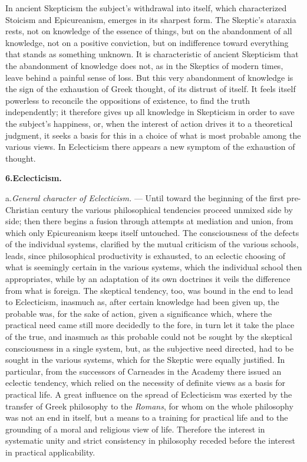 In ancient Skepticism the subject's withdrawal into itself,
which characterized Stoicism and Epicureanism, emerges in
its sharpest form. The Skeptic's ataraxia rests, not on
knowledge of the essence of things, but on the abandonment of all
knowledge, not on a positive conviction, but on indifference toward everything that stands as something unknown. It is characteristic
of ancient Skepticism that the abandonment of knowledge does not,
as in the Skeptics of modern times, leave behind a painful
sense of loss. But this very abandonment of knowledge is the sign of
the exhaustion of Greek thought, of its distrust of itself.
It feels itself powerless to reconcile the oppositions of existence, to find the truth independently; it therefore gives up
all knowledge in Skepticism in order to save the subject's happiness, or,
when the interest of action drives it to a theoretical judgment, it seeks
a basis for this in a choice of what is most probable among the various views. In Eclecticism there appears
a new symptom of the exhaustion of thought.

\divrule

\begin{center}
\textbf{6.\enspace Eclecticism.}
\end{center}

a.\enspace \emph{General character of Eclecticism.} --- Until
toward the beginning of the first pre-Christian century the various philosophical tendencies proceed unmixed side by side; then there begins a fusion through attempts at mediation and union, from which
only Epicureanism keeps itself untouched. The consciousness of the defects of the individual
systems, clarified by the mutual criticism of the various
schools, leads, since philosophical productivity
is exhausted, to an eclectic choosing of what is seemingly certain in the various
systems, which the individual school then
appropriates, while by an adaptation of its own doctrines it veils the difference from what is foreign. The
skeptical tendency, too, was bound in the end to lead to Eclecticism, inasmuch as,
after certain knowledge had been given up, the probable was, for the sake of
action, given a significance which, where the
practical need came still more decidedly to the fore, in turn
let it take the place of the true, and inasmuch as this probable could not
be sought by the skeptical consciousness in a single system,
but, as the subjective need directed, had to be sought in the
various systems, which for the Skeptic were equally justified. In particular,
from the successors of Carneades in the Academy there issued an eclectic
tendency, which relied on the necessity of definite
views as a basis for practical life. A great influence on the spread of Eclecticism was exerted by the transfer of Greek
philosophy to the \emph{Romans}, for whom on the whole
philosophy was not an end in itself, but a means to a training for practical life and to the grounding of a moral
and religious view of life. Therefore the interest in
systematic unity and strict consistency in philosophy receded before the interest in practical applicability.

